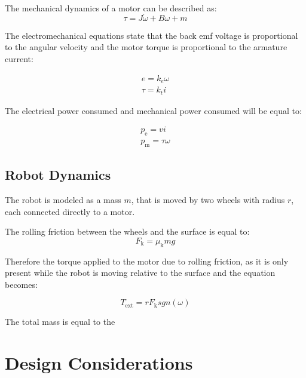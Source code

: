 \noindent
The mechanical dynamics of a motor can be described as:
\begin{equation}
\tau = J\dot{\omega} + B\omega + m
\end{equation}

\noindent
The electromechanical equations state that the back emf voltage is proportional to the angular velocity and the motor torque is proportional to the armature current:

\begin{equation}
\begin{gathered}
e = k_{e} \omega \\
\tau = k_{t} i
\end{gathered}
\end{equation}

\noindent
The electrical power consumed and mechanical power consumed will be equal to:

\begin{equation}
\begin{gathered}
p_{\text{e}} = vi \\
p_{\text{m}} = \tau\omega
\end{gathered}
\end{equation}


\subsection{Robot Dynamics}
The robot is modeled as a mass $m$, that is moved by two wheels with radius $r$, each connected directly to a motor.


The rolling friction between the wheels and the surface is equal to:
\begin{equation}
F_{\text{k}} = \mu_{\text{k}}mg
\end{equation}

Therefore the torque applied to the motor due to rolling friction, as it is only present while the robot is moving relative to the surface and the equation becomes:

\begin{equation}
T_{\text{ext}} = rF_{\text{k}} sgn(\omega)
\end{equation}

\noindent
The total mass is equal to the 



\section{Design Considerations}
\label{sec:design_considerations}

